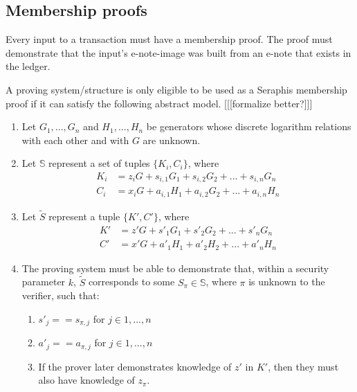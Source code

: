 \subsection{Membership proofs}
\label{subsec:seraphis-membership proofs}

Every input to a transaction must have a membership proof. The proof must demonstrate that the input's e-note-image was built from an e-note that exists in the ledger.

A proving system/structure is only eligible to be used as a Seraphis membership proof if it can satisfy the following abstract model. [[[formalize better?]]]

\begin{enumerate}
    \item Let $G_1,...,G_n$ and $H_1,...,H_n$ be generators whose discrete logarithm relations with each other and with $G$ are unknown.

    \item Let $\mathbb{S}$ represent a set of tuples $\{K_i, C_i\}$, where\vspace{.115cm}
    \begin{align*}
        K_i &= z_i G + s_{i,1} G_1 + s_{i,2} G_2 + ... + s_{i,n} G_n \\
        C_i &= x_i G + a_{i,1} H_1 + a_{i,2} G_2 + ... + a_{i,n} H_n
    \end{align*}

    \item Let $\tilde{S}$ represent a tuple $\{K', C'\}$, where\vspace{.115cm}
    \begin{align*}
        K' &= z' G + s'_1 G_1 + s'_2 G_2 + ... + s'_n G_n \\
        C' &= x' G + a'_1 H_1 + a'_2 H_2 + ... + a'_n H_n
    \end{align*}

    \item The proving system must be able to demonstrate that, within a security parameter $k$, $\tilde{S}$ corresponds to some $S_{\pi} \in \mathbb{S}$, where $\pi$ is unknown to the verifier, such that:
    \begin{enumerate}
        \item $s'_j == s_{\pi,j}$ for $j \in 1,...,n$
        \item $a'_j == a_{\pi,j}$ for $j \in 1,...,n$
        \item If the prover later demonstrates knowledge of $z'$ in $K'$, then they must also have knowledge of $z_{\pi}$.
    \end{enumerate}
    

\end{enumerate}
